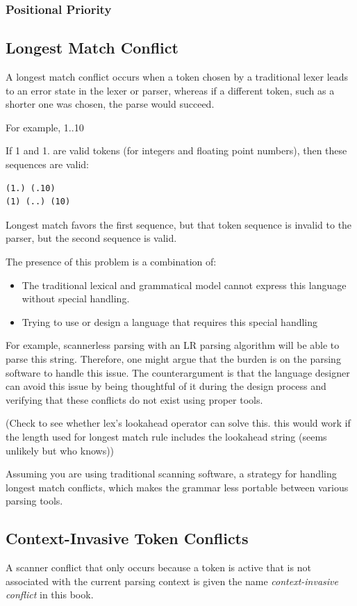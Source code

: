 \documentclass{book}
\newcommand{\newterm}[2]{\textit{#1}\index{#2}}
\begin{document}
\subsubsection{Positional Priority}

\subsection{Longest Match Conflict}
A longest match conflict occurs when a token chosen by
a traditional lexer leads to an error state in the lexer
or parser, whereas if a different token, such as a shorter
one was chosen, the parse would succeed.

For example, 1..10

If 1 and 1. are valid tokens (for integers and floating point numbers),
then these sequences are valid:
\begin{verbatim}
(1.) (.10)
(1) (..) (10)
\end{verbatim}

Longest match favors the first sequence, but that token sequence
is invalid to the parser, but the second sequence is valid.

The presence of this problem is a combination of:
\begin{itemize}
    \item
    The traditional lexical and grammatical model cannot express
this language without special handling.
    \item    Trying to use or design a language that requires this
special handling
\end{itemize}


For example, scannerless parsing with an LR parsing algorithm 
will be able to parse this string. Therefore, one might argue
that the burden is on the parsing software to handle this issue.
The counterargument is that the language designer can avoid
this issue by being thoughtful of it during the design process
and verifying that these conflicts do not exist using proper
tools.

(Check to see whether lex's lookahead operator can solve this.
this would work if the length used for longest match rule includes
the lookahead string (seems unlikely but who knows))

Assuming you are using traditional scanning software,
a strategy for handling longest match conflicts, 
which makes the grammar less portable between various parsing tools.

\subsection{Context-Invasive Token Conflicts}
A scanner conflict that only occurs because a
token is active that is not associated with the
current parsing context is given the name
\newterm{context-invasive conflict}{Context-invasive Token Conflict}
in this book.
\end{document}
